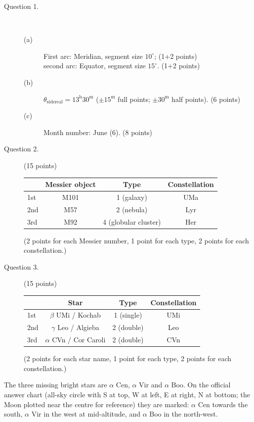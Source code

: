 \begin{description}
\item[Question 1.]~
  \begin{description}
  \item[(a)] First arc: Meridian, segment size $10^\circ$;
    \hfill(1+2 points)\\
    second arc: Equator, segment size $15^\circ$. \hfill(1+2 points)
  \item[(b)] $\theta_{\mathrm{sidereal}} = 13^{\mathrm{h}}30^{\mathrm{m}}$
    ($\pm 15^{\mathrm{m}}$ full points; $\pm 30^{\mathrm{m}}$ half points).
    \hfill(6 points)
  \item[(c)] Month number: June (6). \hfill(8 points)
  \end{description}
\item[Question 2.] (15 points)

  \begin{center}
  \begin{tabular}{lccc}
  & Messier object & Type & Constellation \\
  \hline
  1st & M101 & 1 (galaxy) & UMa \\
  2nd & M57 & 2 (nebula) & Lyr \\
  3rd & M92 & 4 (globular cluster) & Her \\
  \end{tabular}
  \end{center}

  (2 points for each Messier number, 1 point for each type, 2 points for
  each constellation.)
\item[Question 3.] (15 points)

  \begin{center}
  \begin{tabular}{lccc}
  & Star & Type & Constellation \\
  \hline
  1st & $\beta$ UMi / Kochab & 1 (single) & UMi \\
  2nd & $\gamma$ Leo / Algieba & 2 (double) & Leo \\
  3rd & $\alpha$ CVn / Cor Caroli & 2 (double) & CVn \\
  \end{tabular}
  \end{center}

  (2 points for each star name, 1 point for each type, 2 points for each
  constellation.)
\end{description}

The three missing bright stars are $\alpha$ Cen, $\alpha$ Vir and
$\alpha$ Boo. On the official answer chart (all-sky circle with S at top,
W at left, E at right, N at bottom; the Moon plotted near the centre for
reference) they are marked: $\alpha$ Cen towards the south, $\alpha$ Vir
in the west at mid-altitude, and $\alpha$ Boo in the north-west.

